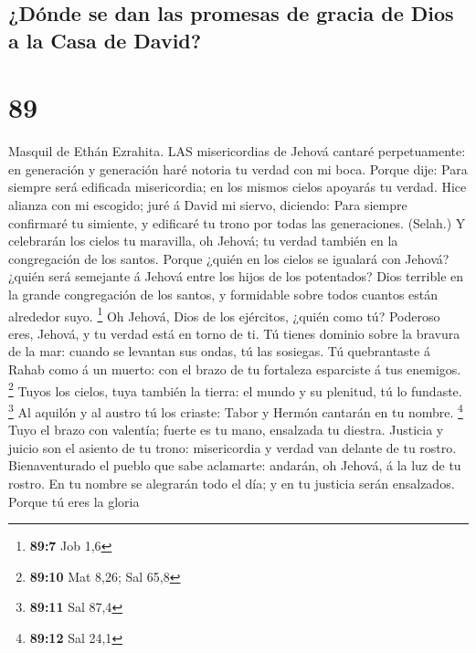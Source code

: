 \hypertarget{duxf3nde-se-dan-las-promesas-de-gracia-de-dios-a-la-casa-de-david}{%
\subsection{¿Dónde se dan las promesas de gracia de Dios a la Casa de
David?}\label{duxf3nde-se-dan-las-promesas-de-gracia-de-dios-a-la-casa-de-david}}

\hypertarget{section-88}{%
\section{89}\label{section-88}}

 Masquil de Ethán Ezrahita. LAS misericordias de Jehová
cantaré perpetuamente: en generación y generación haré notoria tu verdad
con mi boca.  Porque dije: Para siempre será edificada
misericordia; en los mismos cielos apoyarás tu verdad.  Hice
alianza con mi escogido; juré á David mi siervo, diciendo: 
Para siempre confirmaré tu simiente, y edificaré tu trono por todas las
generaciones. (Selah.)  Y celebrarán los cielos tu
maravilla, oh Jehová; tu verdad también en la congregación de los
santos.  Porque ¿quién en los cielos se igualará con Jehová?
¿quién será semejante á Jehová entre los hijos de los potentados?
 Dios terrible en la grande congregación de los santos, y
formidable sobre todos cuantos están alrededor suyo. \footnote{\textbf{89:7}
  Job 1,6}  Oh Jehová, Dios de los ejércitos, ¿quién como
tú? Poderoso eres, Jehová, y tu verdad está en torno de ti. 
Tú tienes dominio sobre la bravura de la mar: cuando se levantan sus
ondas, tú las sosiegas.  Tú quebrantaste á Rahab como á un
muerto: con el brazo de tu fortaleza esparciste á tus enemigos.
\footnote{\textbf{89:10} Mat 8,26; Sal 65,8}  Tuyos los
cielos, tuya también la tierra: el mundo y su plenitud, tú lo fundaste.
\footnote{\textbf{89:11} Sal 87,4}  Al aquilón y al austro
tú los criaste: Tabor y Hermón cantarán en tu nombre. \footnote{\textbf{89:12}
  Sal 24,1}  Tuyo el brazo con valentía; fuerte es tu mano,
ensalzada tu diestra.  Justicia y juicio son el asiento de
tu trono: misericordia y verdad van delante de tu rostro. 
Bienaventurado el pueblo que sabe aclamarte: andarán, oh Jehová, á la
luz de tu rostro.  En tu nombre se alegrarán todo el día; y
en tu justicia serán ensalzados.  Porque tú eres la gloria
